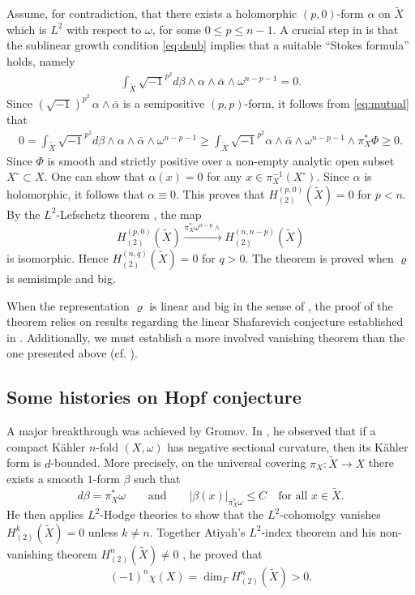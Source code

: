 \documentclass[english]{amsproc}
\theoremstyle{plain}
\theoremstyle{definition}
\theoremstyle{remark}
\theoremstyle{plain}
\numberwithin{equation}{thm} %
\begin{document}
	Assume, for contradiction, that there exists a holomorphic \((p,0)\)-form \(\alpha\) on 
	\(\widetilde{X}\) which is \(L^{2}\) with respect to \(\omega\), for some \(0\le p\le n-1\).
	A crucial step in \cite[Theorem~2.2]{DW24b} is that the sublinear growth condition 
	\eqref{eq:dsub} implies that a suitable ``Stokes formula'' holds, namely 
		\begin{align*} 
			\int_{\widetilde{X} }  	\sqrt{-1}^{p^2}	 d\beta \wedge \alpha\wedge \bar{\alpha}\wedge \omega^{n-p-1}=0.
		\end{align*}   
	Since \((\sqrt{-1})^{p^{2}}\,\alpha\wedge \bar{\alpha}\) is a semipositive \((p,p)\)-form, it follows 
	from \eqref{eq:mutual} that
		\begin{align}\label{eq:pointwise}
			0=	\int_{\widetilde{X} }  	\sqrt{-1}^{p^2}	 d\beta \wedge \alpha\wedge \bar{\alpha}\wedge \omega^{n-p-1}	\geq \int_{\widetilde{X}}  	\sqrt{-1}^{p^2}	  \alpha\wedge \bar{\alpha} \wedge \omega^{n-p-1}\wedge  \pi_X^*\Phi\geq 0.
		\end{align}
		Since $\Phi$ is smooth and strictly positive over a non-empty analytic open subset \( X^\circ \subset X \). One can show that 
		$
		\alpha(x)=0
		$ 
		for any $x\in \pi_X^{-1}(X^\circ)$.  Since $\alpha$ is holomorphic, it follows that  $\alpha\equiv 0$.  This proves that $H^{(p,0)}_{(2)}(\widetilde{X})=0$ for $p<n$. By the $L^2$-Lefschetz theorem \cite{Gro92}, the map
		$$
		H^{(p,0)}_{(2)}(\widetilde{X})\stackrel{ \pi_X^*\omega^{n-p}\wedge }{\to} H^{(n,n-p)}_{(2)}(\widetilde{X})
		$$
		is isomorphic. Hence $H^{(n,q)}_{(2)}(\widetilde{X})=0$ for $q>0$. 	
		The theorem is proved when $\varrho$ is semisimple and big. 
		
		When the representation $\varrho$ is linear and big in the sense of \cite{DW24b}, the proof of the theorem relies on results regarding the linear  {Shafarevich conjecture} established in \cite{EKPR12}. Additionally, we must establish a more involved  {vanishing theorem} than the one presented above (cf. \cite[Theorem 2.2]{DW24b}). 
	\iffalse
	\subsection{Some histories on Hopf conjecture}
	A major breakthrough was achieved by Gromov. In \cite{Gro92}, he observed that if a compact Kähler $n$-fold \((X,\omega)\) has negative sectional curvature, then its Kähler form is \(d\)-bounded. More precisely, on the universal covering 
	\(\pi_X : \widetilde{X} \to X\) there exists a smooth \(1\)-form \(\beta\) such that
	\[
	d\beta = \pi_X^{*}\omega
	\qquad\text{and}\qquad
	|\beta(x)|_{\pi_X^{*}\omega} \le C
	\quad\text{for all } x \in \widetilde{X}.
	\]
	He then applies $L^2$-Hodge theories to show that the $L^2$-cohomolgy vanishes $H^k_{(2)}(\widetilde{X})=0$ unless $k\neq n$.  Together Atiyah's $L^2$-index theorem and his non-vanishing theorem $H^n_{(2)}(\widetilde{X})\neq 0$ , he proved that 
	$$
	(-1)^n\chi(X)= \dim_{\Gamma} H^n_{(2)}(\widetilde{X})>0. 
	$$
	
\end{document}
